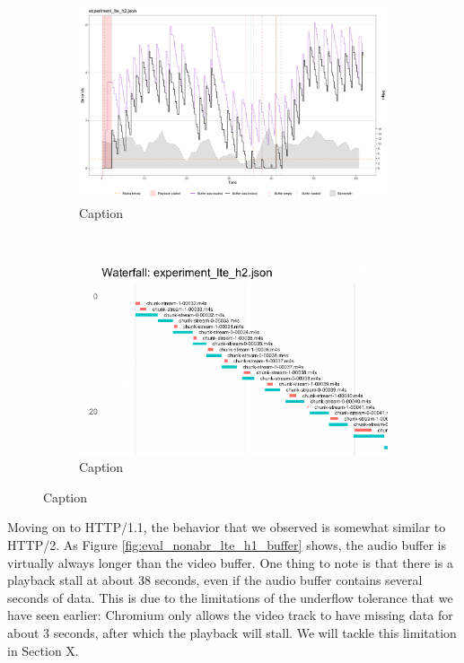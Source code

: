 \begin{figure}[h]
	\centering
	
	\begin{subfigure}[t]{0.45\textwidth}
		\centering
		\includegraphics[width=\textwidth]{res/eval_nonabr_lte_h2.png}
		\caption{Caption}
		\label{fig:eval_nonabr_lte_h2_buffer}
	\end{subfigure}%
	~ 
	\begin{subfigure}[t]{0.45\textwidth}
		\centering
		\includegraphics[width=\textwidth]{res/eval_nonabr_lte_h2_waterfall.png}
		\caption{Caption}
		\label{fig:eval_nonabr_lte_h2_waterfall}
	\end{subfigure}
	
	\caption{Caption}
	\label{fig:eval_nonabr_lte_h2}
\end{figure}

Moving on to HTTP/1.1, the behavior that we observed is somewhat similar to HTTP/2. As Figure \ref{fig:eval_nonabr_lte_h1_buffer} shows, the audio buffer is virtually always longer than the video buffer. One thing to note is that there is a playback stall at about 38 seconds, even if the audio buffer contains several seconds of data. This is due to the limitations of the underflow tolerance that we have seen earlier: Chromium only allows the video track to have missing data for about 3 seconds, after which the playback will stall. We will tackle this limitation in Section X.

